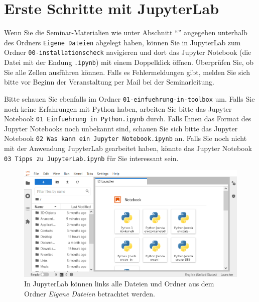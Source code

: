 \documentclass{tufte-handout}
\begin{document}
\section{Erste Schritte mit JupyterLab}

Wenn Sie die Seminar-Materialien wie unter Abschnitt \enquote{} angegeben unterhalb des Ordners \texttt{Eigene Dateien} abgelegt haben, 
können Sie in JupyterLab zum Ordner 
\texttt{00-installationscheck}
navigieren und dort das Jupyter Notebook (die Datei mit der Endung \texttt{.ipynb}) mit einem Doppelklick öffnen.
Überprüfen Sie, ob Sie alle Zellen ausführen können.
Falls es Fehlermeldungen gibt, melden Sie sich bitte vor Beginn der Veranstaltung per Mail bei der Seminarleitung.

Bitte schauen Sie ebenfalls im Ordner
\texttt{01-einfuehrung-in-toolbox}
um.
Falls Sie noch keine Erfahrungen mit Python haben, arbeiten Sie bitte das Jupyter Notebook
\texttt{01 Einfuehrung in Python.ipynb}
durch.
Falls Ihnen das Format des Jupyter Notebooks noch unbekannt sind, schauen Sie sich bitte das Jupyter Notebook
\texttt{02 Was kann ein Jupyter Notebook.ipynb}
an.
Falls Sie noch nicht mit der Anwendung JupyterLab gearbeitet haben, könnte das Jupyter Notebook \texttt{03 Tipps zu JupyterLab.ipynb} für Sie interessant sein.

\begin{figure}[h]
  \includegraphics{jupyterlab-running}
  \caption{In JupyterLab können links alle Dateien und Ordner aus dem Ordner \emph{Eigene Dateien} betrachtet werden.}%
\label{fig:start-jupyterlab}
\end{figure}

\doclicenseThis{}
\end{document}
